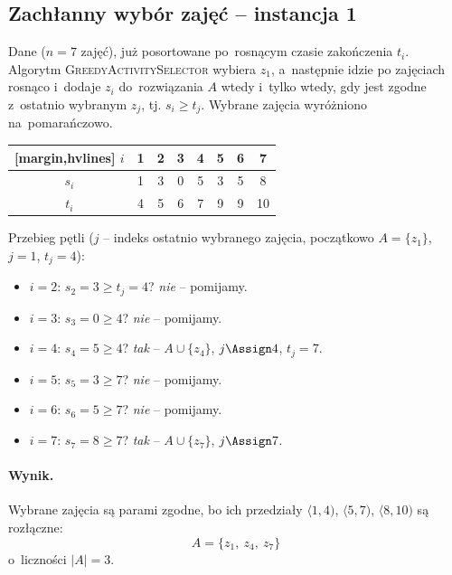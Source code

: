 \subsection{Zachłanny wybór zajęć -- instancja 1}

Dane ($n = 7$ zajęć), już posortowane po~rosnącym czasie zakończenia $t_i$.
Algorytm \textsc{GreedyActivitySelector} wybiera $z_1$, a~następnie idzie po
zajęciach rosnąco i~dodaje $z_i$ do~rozwiązania $A$ wtedy i~tylko wtedy, gdy jest
zgodne z~ostatnio wybranym $z_j$, tj. $s_i \geq t_j$. Wybrane zajęcia wyróżniono
na~\textcolor{accentB}{pomarańczowo}.

\begin{aztable}
	\centering
	\renewcommand{\arraystretch}{1.2}
	\begin{NiceTabular}{c|ccccccc}[margin,hvlines]
		$i$   & \color{accentB}1 & 2 & 3 & \color{accentB}4 & 5 & 6 & \color{accentB}7  \\
		\hline
		$s_i$ & \color{accentB}1 & 3 & 0 & \color{accentB}5 & 3 & 5 & \color{accentB}8  \\
		$t_i$ & \color{accentB}4 & 5 & 6 & \color{accentB}7 & 9 & 9 & \color{accentB}10
	\end{NiceTabular}
\end{aztable}

\begin{dygresja}
	Przebieg pętli ($j$ -- indeks ostatnio wybranego zajęcia, początkowo
	$A = \{z_1\}$, $j = 1$, $t_j = 4$):
	\begin{itemize}
		\item $i = 2$: $s_2 = 3 \geq t_j = 4$? \emph{nie} -- pomijamy.
		\item $i = 3$: $s_3 = 0 \geq 4$? \emph{nie} -- pomijamy.
		\item $i = 4$: $s_4 = 5 \geq 4$? \emph{tak} -- $A \cup \{z_4\}$, $j \Assign 4$, $t_j = 7$.
		\item $i = 5$: $s_5 = 3 \geq 7$? \emph{nie} -- pomijamy.
		\item $i = 6$: $s_6 = 5 \geq 7$? \emph{nie} -- pomijamy.
		\item $i = 7$: $s_7 = 8 \geq 7$? \emph{tak} -- $A \cup \{z_7\}$, $j \Assign 7$.
	\end{itemize}
\end{dygresja}

\paragraph{Wynik.}
Wybrane zajęcia są parami zgodne, bo ich przedziały
$\langle 1, 4)$, $\langle 5, 7)$, $\langle 8, 10)$ są rozłączne:
\[
	\boxed{A = \{z_1,\ z_4,\ z_7\}}
\]
o~liczności $|A| = 3$. 
